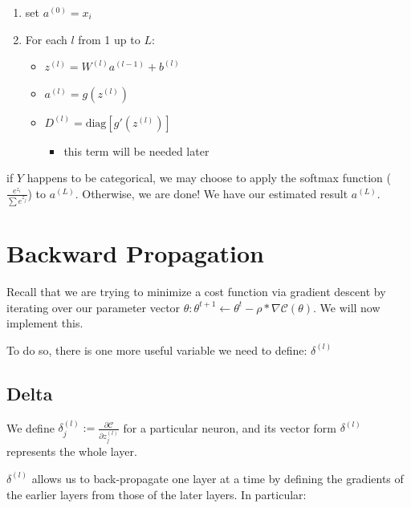 \documentclass[
]{book}
\providecommand{\tightlist}{%
  \setlength{\itemsep}{0pt}\setlength{\parskip}{0pt}}
\begin{document}
\begin{enumerate}
\def\labelenumi{\arabic{enumi}.}
\tightlist
\item
  set \(a^{(0)} = x_i\)
\item
  For each \(l\) from 1 up to \(L\):

  \begin{itemize}
  \tightlist
  \item
    \(z^{(l)} = W^{(l)} a^{(l - 1)} + b^{(l)}\)
  \item
    \(a^{(l)} = g\left(z^{(l)}\right)\)
  \item
    \(D^{(l)} = \text{diag} \left[g'\left(z^{(l)}\right)\right]\)

    \begin{itemize}
    \tightlist
    \item
      this term will be needed later
    \end{itemize}
  \end{itemize}
\end{enumerate}

if \(Y\) happens to be categorical, we may choose to apply the softmax function (\(\frac{e^{z_i}}{\sum e^{z_j}}\)) to \(a^{(L)}\). Otherwise, we are done! We have our estimated result \(a^{(L)}\).

\hypertarget{backward-propagation}{%
\section{Backward Propagation}\label{backward-propagation}}

Recall that we are trying to minimize a cost function via gradient descent by iterating over our parameter vector \(\theta: \theta^{t + 1} \leftarrow \theta^t - \rho * \nabla\mathcal{C}(\theta)\). We will now implement this.

To do so, there is one more useful variable we need to define: \(\delta^{(l)}\)

\hypertarget{delta}{%
\subsection{Delta}\label{delta}}

We define \(\delta^{(l)}_j := \frac{\partial \mathcal{C}}{\partial z^{(l)}_j}\) for a particular neuron, and its vector form \(\delta^{(l)}\) represents the whole layer.

\(\delta^{(l)}\) allows us to back-propagate one layer at a time by defining the gradients of the earlier layers from those of the later layers. In particular:
\end{document}
